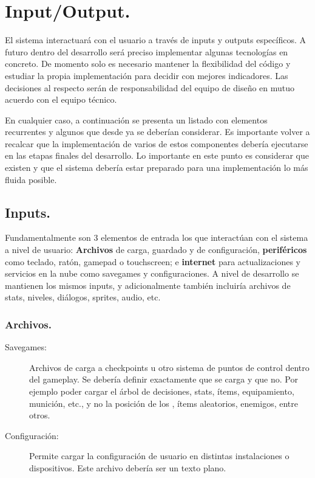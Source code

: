
\section{Input/Output.}\label{io:input-output}

El sistema interactuará con el usuario a través de inputs y outputs específicos. A futuro dentro del desarrollo será preciso implementar algunas tecnologías en concreto. De momento solo es necesario mantener la flexibilidad del código y estudiar la propia implementación para decidir con mejores indicadores. Las decisiones al respecto serán de responsabilidad del equipo de diseño en mutuo acuerdo con el equipo técnico.

En cualquier caso, a continuación se presenta un listado con elementos recurrentes y algunos que desde ya se deberían considerar. Es importante volver a recalcar que la implementación de varios de estos componentes debería ejecutarse en las etapas finales del desarrollo. Lo importante en este punto es considerar que existen y que el sistema debería estar preparado para una implementación lo más fluida posible.

\subsection{Inputs.}
Fundamentalmente son 3 elementos de entrada los que interactúan con el sistema a nivel de usuario: \textbf{Archivos} de carga, guardado y de configuración, \textbf{periféricos} como teclado, ratón, gamepad o touchscreen; e \textbf{internet} para actualizaciones y servicios en la nube como savegames y configuraciones. A nivel de desarrollo se mantienen los mismos inputs, y adicionalmente también incluiría archivos de stats, niveles, diálogos, sprites, audio, etc.

\subsubsection{Archivos.}

\begin{description}
\item[Savegames:] Archivos de carga a checkpoints u otro sistema de puntos de control dentro del gameplay. Se debería definir exactamente que se carga y que no. Por ejemplo poder cargar el árbol de decisiones, stats, ítems, equipamiento, munición, etc., y no la posición de los , ítems aleatorios, enemigos, entre otros.

\item[Configuración:] Permite cargar la configuración de usuario en distintas instalaciones o dispositivos. Este archivo debería ser un texto plano.
\end{description}

